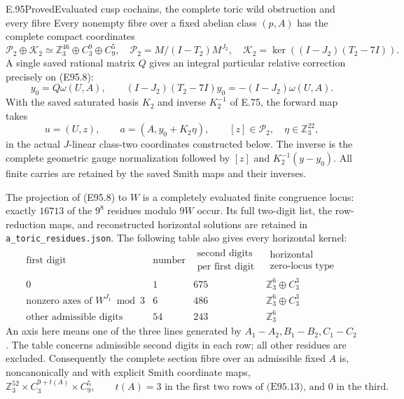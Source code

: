 \begin{statement}{E.95}{Proved}{Evaluated cusp cochains, the complete toric wild obstruction and every fibre}
Every nonempty fibre over a fixed abelian class $(p,A)$
has the complete compact coordinates
\[
 \mathcal P_2\oplus\mathcal K_2
 \simeq\mathbb Z_3^{46}\oplus C_3^9\oplus C_9^5,
 \quad
 \mathcal P_2=M/(I-T_2)M^{J_2},\quad
 \mathcal K_2=\ker((I-J_2)(T_2-7I)).
 \tag{E95.10}
\]
A single saved rational matrix $Q$ gives an integral
particular relative correction precisely on (E95.8):
\[
 y_0=Q\omega(U,A),\qquad
 (I-J_2)(T_2-7I)y_0=-(I-J_2)\omega(U,A).
 \tag{E95.11}
\]
With the saved saturated basis $K_2$ and inverse $K_2^{-1}$
of E.75, the forward map takes
\[
       u=(U,z),\qquad a=(A,y_0+K_2\eta),
       \qquad [z]\in\mathcal P_2,\quad\eta\in\mathbb Z_3^{22},
 \tag{E95.12}
\]
in the actual $J$-linear class-two coordinates constructed
below. The inverse is the complete geometric gauge
normalization followed by $[z]$ and
$K_2^{-1}(y-y_0)$. All finite carries are retained by
the saved Smith maps and their inverses.

The projection of (E95.8) to $W$ is a completely evaluated
finite congruence locus: exactly $16713$ of the $9^8$
residues modulo $9W$ occur. Its full two-digit list,
the row-reduction maps, and reconstructed horizontal
solutions are retained in \texttt{a\_toric\_residues.json}.
The following table also gives every horizontal kernel:
\[
\begin{array}{c|r|r|c}
\text{first digit}&\text{number}&
 \substack{\text{second digits}\\\text{per first digit}}
 &\substack{\text{horizontal}\\\text{zero-locus type}}\\\hline
0&1&675&\mathbb Z_3^6\oplus C_3^3\\
\text{nonzero axes of }W^{J_1}\bmod3&6&486&\mathbb Z_3^6\oplus C_3^3\\
\text{other admissible digits}&54&243&\mathbb Z_3^6
\end{array}
 \tag{E95.13}
\]
An axis here means one of the three lines generated by
$A_1-A_2,B_1-B_2,C_1-C_2$. The table concerns admissible
second digits in each row; all other residues are excluded.
Consequently the complete section fibre over an admissible
fixed $A$ is, noncanonically and with explicit Smith
coordinate maps,
\[
 \mathbb Z_3^{52}\times C_3^{9+t(A)}\times C_9^5,
 \qquad t(A)=3\text{ in the first two rows of (E95.13), and }0
 \text{ in the third}.
 \tag{E95.14}
\]


\end{statement}
